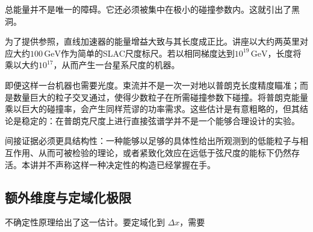 总能量并不是唯一的障碍。它还必须被集中在极小的碰撞参数内。这就引出了黑洞。

\begin{classroomqa}
\end{classroomqa}

为了提供参照，直线加速器的能量增益大致与其长度成正比。讲座以大约两英里对应大约\(100\,\mathrm{GeV}\)作为简单的SLAC尺度标尺。若以相同梯度达到\(10^{19}\,\mathrm{GeV}\)，长度将乘以大约\(10^{17}\)，从而产生一台星系尺度的机器。

即便这样一台机器也需要光度。束流并不是一次一对地以普朗克长度精度瞄准；而是数量巨大的粒子交叉通过，使得少数粒子在所需碰撞参数下碰撞。将普朗克能量乘以巨大的碰撞率，会产生同样荒谬的功率需求。这些估计是有意粗略的，但其结论是稳定的：在普朗克尺度上进行直接弦谱学并不是一个能够合理设计的实验。

间接证据必须更具结构性：一种能够以足够的具体性给出所观测到的低能粒子与相互作用、从而可被检验的理论，或者紧致化效应在远低于弦尺度的能标下仍然存活。本讲并不声称这样一种决定性的构造已经掌握在手。

\subsection{额外维度与定域化极限}

\begin{classroomqa}
\end{classroomqa}

\begin{classroomqa}
\end{classroomqa}

不确定性原理给出了这一估计。要定域化到 \(\Delta x\)，需要

